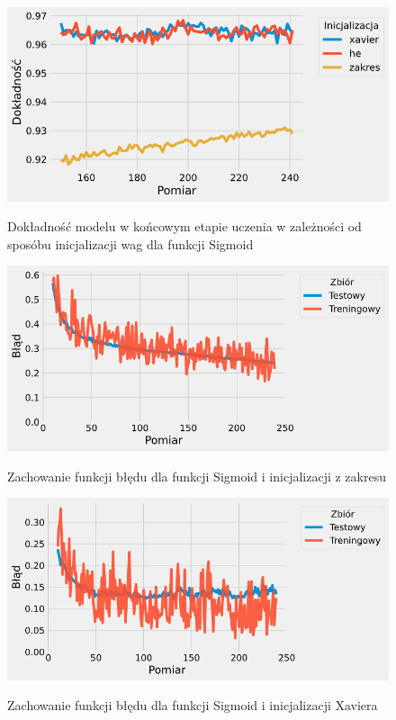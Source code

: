 \documentclass{article}
\begin{document}
\begin{figure}[H]
	\centering
	\caption{Dokładność modelu w końcowym etapie uczenia w zależności od sposóbu inicjalizacji wag dla funkcji Sigmoid}
	\includegraphics[width=\textwidth]{sig_init_acc_zoom.png}
	\label{fig:res207}
\end{figure}
\begin{figure}[H]
	\centering
	\caption{Zachowanie funkcji błędu dla funkcji Sigmoid i inicjalizacji z zakresu}
	\includegraphics[width=\textwidth]{sig_init_zak.png}
	\label{fig:res208}
\end{figure}
\begin{figure}[H]
	\centering
	\caption{Zachowanie funkcji błędu dla funkcji Sigmoid i inicjalizacji Xaviera}
	\includegraphics[width=\textwidth]{sig_init_xav.png}
	\label{fig:res209}
\end{figure}
\end{document}
